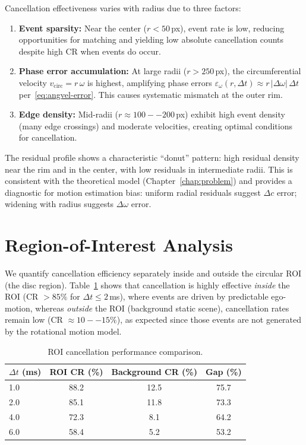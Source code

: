 Cancellation effectiveness varies with radius due to three factors:
\begin{enumerate}
\item \textbf{Event sparsity:} Near the center ($r < 50$\,px), event rate is low, reducing opportunities for matching and yielding low absolute cancellation counts despite high CR when events do occur.
\item \textbf{Phase error accumulation:} At large radii ($r > 250$\,px), the circumferential velocity $v_{\text{circ}} = r\,\omega$ is highest, amplifying phase errors $\varepsilon_{\omega}(r,\Delta t) \approx r\,|\Delta\omega|\,\Delta t$ per~\eqref{eq:angvel-error}. This causes systematic mismatch at the outer rim.
\item \textbf{Edge density:} Mid-radii ($r \approx 100--200$\,px) exhibit high event density (many edge crossings) and moderate velocities, creating optimal conditions for cancellation.
\end{enumerate}

The residual profile shows a characteristic ``donut'' pattern: high residual density near the rim and in the center, with low residuals in intermediate radii. This is consistent with the theoretical model (Chapter~\ref{chap:problem}) and provides a diagnostic for motion estimation bias: uniform radial residuals suggest $\Delta c$ error; widening with radius suggests $\Delta\omega$ error.

\section{Region-of-Interest Analysis}

We quantify cancellation efficiency separately inside and outside the circular ROI (the disc region). Table~\ref{tab:roi_comparison} shows that cancellation is highly effective \emph{inside} the ROI (CR $> 85\%$ for $\Delta t \leq 2$\,ms), where events are driven by predictable ego-motion, whereas \emph{outside} the ROI (background static scene), cancellation rates remain low (CR $\approx 10--15\%$), as expected since those events are not generated by the rotational motion model.

\begin{table}[t]
  \centering
  \caption{ROI cancellation performance comparison.}
  \label{tab:roi_comparison}
  \begin{tabular}{lccc}
    \toprule
    \textbf{$\Delta t$ (ms)} & \textbf{ROI CR (\%)} & \textbf{Background CR (\%)} & \textbf{Gap (\%)} \\
    \midrule
    1.0 & 88.2 & 12.5 & 75.7 \\
    2.0 & 85.1 & 11.8 & 73.3 \\
    4.0 & 72.3 & 8.1 & 64.2 \\
    6.0 & 58.4 & 5.2 & 53.2 \\
    \bottomrule
  \end{tabular}
\end{table}

